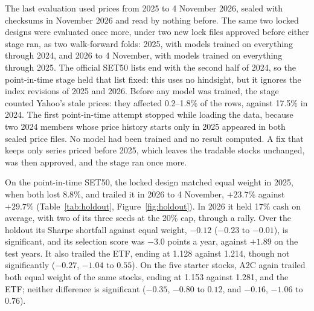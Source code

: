 The last evaluation used prices from 2025 to 4 November 2026, sealed with checksums in November 2026 and
read by nothing before. The same two locked designs were evaluated once more, under two new lock files
approved before either stage ran, as two walk-forward folds: 2025, with models trained on everything
through 2024, and 2026 to 4 November, with models trained on everything through 2025. The official SET50
lists end with the second half of 2024, so the point-in-time stage held that list fixed: this uses no
hindsight, but it ignores the index revisions of 2025 and 2026. Before any model was trained, the stage
counted Yahoo's stale prices: they affected 0.2--1.8\% of the rows, against 17.5\% in 2024. The first
point-in-time attempt stopped while loading the data, because two 2024 members whose price history starts
only in 2025 appeared in both sealed price files. No model had been trained and no result computed. A fix
that keeps only series priced before 2025, which leaves the tradable stocks unchanged, was then approved,
and the stage ran once more.

On the point-in-time SET50, the locked design matched equal weight in 2025, when both lost 8.8\%, and
trailed it in 2026 to 4 November, $+23.7\%$ against $+29.7\%$ (Table~\ref{tab:holdout},
Figure~\ref{fig:holdout}). In 2026 it held 17\% cash on average, with two of its three seeds at the 20\%
cap, through a rally. Over the holdout its Sharpe shortfall against equal weight, $-0.12$ ($-0.23$ to
$-0.01$), is significant, and its selection score was $-3.0$ points a year, against $+1.89$ on the test
years. It also trailed the ETF, ending at 1.128 against 1.214, though not significantly ($-0.27$, $-1.04$
to $0.55$). On the five starter stocks, A2C again trailed both equal weight of the same stocks, ending at
1.153 against 1.281, and the ETF; neither difference is significant ($-0.35$, $-0.80$ to $0.12$, and
$-0.16$, $-1.06$ to $0.76$).

